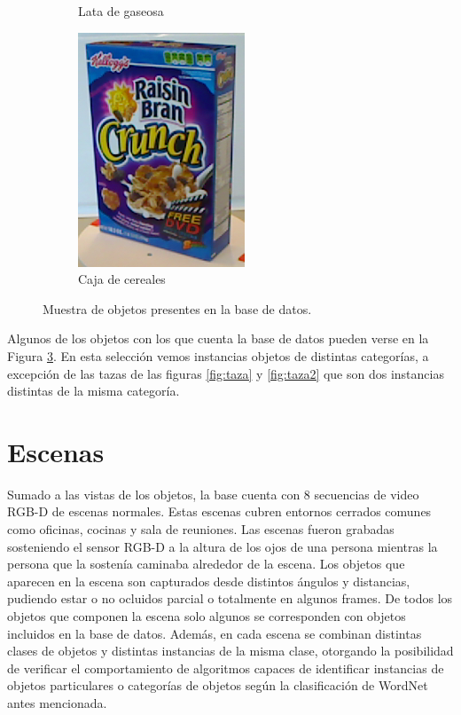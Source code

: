 \begin{figure}[t]
\begin{subfigure}[b]{0.4\textwidth}
        \caption{Lata de gaseosa}
		\label{fig:lata}
    \end{subfigure}
	\quad
    \begin{subfigure}[b]{0.4\textwidth}
		\centering
        \includegraphics[scale=0.6]{img/base_rgbd/caja.png}
        \caption{Caja de cereales}
		\label{fig:caja}
    \end{subfigure}
    \caption{Muestra de objetos presentes en la base de datos.}
    \label{fig:ejemplo_objetos_base}
\end{figure}

Algunos de los objetos con los que cuenta la base de datos pueden verse en la Figura \ref{fig:ejemplo_objetos_base}. En esta selección vemos instancias objetos de distintas categorías, a excepción de las tazas de las figuras \ref{fig:taza} y \ref{fig:taza2} que son dos instancias distintas de la misma categoría.


\section{Escenas}
Sumado a las vistas de los objetos, la base cuenta con 8 secuencias de video RGB-D de escenas normales. Estas escenas cubren entornos cerrados comunes como oficinas, cocinas y sala de reuniones. Las escenas fueron grabadas sosteniendo el sensor RGB-D a la altura de los ojos de una persona mientras la persona que la sostenía caminaba alrededor de la escena. Los objetos que aparecen en la escena son capturados desde distintos ángulos y distancias, pudiendo estar o no ocluidos parcial o totalmente en algunos frames. De todos los objetos que componen la escena solo algunos se corresponden con objetos incluidos en la base de datos. Además, en cada escena se combinan distintas clases de objetos y distintas instancias de la misma clase, otorgando la posibilidad de verificar el comportamiento de algoritmos capaces de identificar instancias de objetos particulares o categorías de objetos según la clasificación de WordNet antes mencionada.

